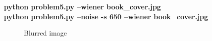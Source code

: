 \pagebreak
\begin{minipage}{\textwidth}
\textbf{python problem5.py --wiener book\_cover.jpg} \\
\textbf{python problem5.py --noise -s 650 --wiener book\_cover.jpg}
\end{minipage}

\begin{figure}[!htb]\centering
    \begin{minipage}{0.45\textwidth}
        \caption{\small{Blurred image}}
    \end{minipage}
    \begin{minipage}{0.45\textwidth}

\end{minipage}
\end{figure}
